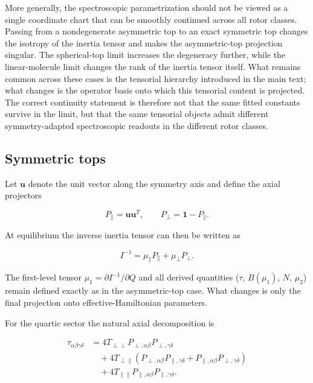 \documentclass[aip,jcp,reprint,floatfix]{revtex4-2}
\begin{document}
More generally, the spectroscopic parametrization should not be viewed
as a single coordinate chart that can be smoothly continued across all
rotor classes. Passing from a nondegenerate asymmetric top to an exact
symmetric top changes the isotropy of the inertia tensor and makes the
asymmetric-top projection singular. The spherical-top limit increases
the degeneracy further, while the linear-molecule limit changes the rank
of the inertia tensor itself. What remains common across these cases is
the tensorial hierarchy introduced in the main text; what changes is the
operator basis onto which this tensorial content is projected. The
correct continuity statement is therefore not that the same fitted
constants survive in the limit, but that the same tensorial objects
admit different symmetry-adapted spectroscopic readouts in the different
rotor classes.

\subsection{Symmetric tops}

Let $\mathbf u$ denote the unit vector along the symmetry axis and
define the axial projectors

\begin{equation}
P_{\parallel} = \mathbf u\mathbf u^T,
\qquad
P_{\perp} = \mathbf 1 - P_{\parallel}.
\end{equation}

At equilibrium the inverse inertia tensor can then be written as

\begin{equation}
I^{-1} = \mu_{\parallel} P_{\parallel} + \mu_{\perp} P_{\perp}.
\end{equation}

The first-level tensor $\mu_1=\partial I^{-1}/\partial Q$ and all
derived quantities ($\tau$, $B(\mu_1)$, $N$, $\mu_2$) remain defined
exactly as in the asymmetric-top case. What changes is only the final
projection onto effective-Hamiltonian parameters.

For the quartic sector the natural axial decomposition is

\begin{equation}
\begin{aligned}
\tau_{\alpha\beta\gamma\delta}
&=
4T_{\perp\perp}
P_{\perp,\alpha\beta}P_{\perp,\gamma\delta}
\\
&\quad
+4T_{\perp\parallel}
\left(
P_{\perp,\alpha\beta}P_{\parallel,\gamma\delta}
+
P_{\parallel,\alpha\beta}P_{\perp,\gamma\delta}
\right)
\\
&\quad
+4T_{\parallel\parallel}
P_{\parallel,\alpha\beta}P_{\parallel,\gamma\delta}.
\end{aligned}
\label{eq:app_sym_tau_decomp}
\end{equation}
\end{document}
